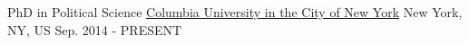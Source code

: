 

\begin{cventries}

  \cventry
    {PhD in Political Science} %
    {\href{http://polisci.columbia.edu/}{Columbia University in the City of New York}} %
    {New York, NY, US} %
    {Sep. 2014 - PRESENT} %
    {
    }

\end{cventries}
